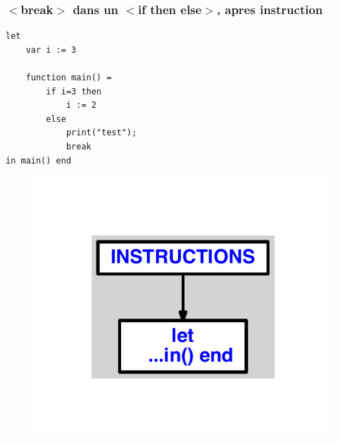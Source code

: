 \documentclass{article}
\begin{document}
\subsubsection{$ < $break$ > $ dans un $ < $if then else$ > $, apres instruction}
\begin{lstlisting}
let
	var i := 3

	function main() =
		if i=3 then
			i := 2
		else
			print("test");
			break
in main() end
\end{lstlisting}
\newpage
\begin{figure}[H]
\centering
\includegraphics[max width=\textwidth]{ast/ast_18.pdf}
\end{figure}
\newpage
\end{document}
